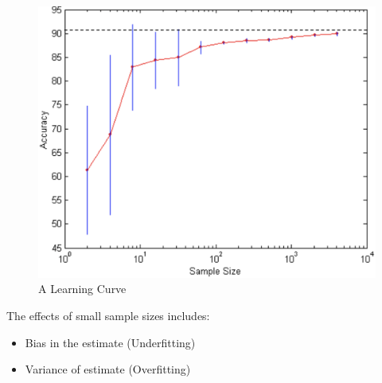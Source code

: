 \bigskip
\begin{figure}[H]
    \centering
    \includegraphics[scale=0.5]{figures/learningcurve.png}
    \caption{A Learning Curve}
\end{figure}

The effects of small sample sizes includes:
\begin{itemize}
    \item Bias in the estimate (Underfitting)
    \item Variance of estimate (Overfitting)
\end{itemize}

